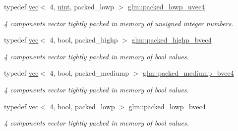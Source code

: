 \begin{DoxyCompactItemize}
\mbox{\label{group__gtc__type__aligned_gaddae01027a0dc8e3d953a3ca68b5a0cd}} 
typedef \hyperlink{structglm_1_1vec}{vec}$<$ 4, \hyperlink{group__core__precision_ga4fd29415871152bfb5abd588334147c8}{uint}, packed\+\_\+lowp $>$ \hyperlink{group__gtc__type__aligned_gaddae01027a0dc8e3d953a3ca68b5a0cd}{glm\+::packed\+\_\+lowp\+\_\+uvec4}
\begin{DoxyCompactList}\small\item\em 4 components vector tightly packed in memory of unsigned integer numbers. \end{DoxyCompactList}\item 
\mbox{\label{group__gtc__type__aligned_gaa7a006e26052e668a16bf3b8bd81cbef}} 
typedef \hyperlink{structglm_1_1vec}{vec}$<$ 4, bool, packed\+\_\+highp $>$ \hyperlink{group__gtc__type__aligned_gaa7a006e26052e668a16bf3b8bd81cbef}{glm\+::packed\+\_\+highp\+\_\+bvec4}
\begin{DoxyCompactList}\small\item\em 4 components vector tightly packed in memory of bool values. \end{DoxyCompactList}\item 
\mbox{\label{group__gtc__type__aligned_gad50db2a2ae76ec64785b9d87cd2dfb2c}} 
typedef \hyperlink{structglm_1_1vec}{vec}$<$ 4, bool, packed\+\_\+mediump $>$ \hyperlink{group__gtc__type__aligned_gad50db2a2ae76ec64785b9d87cd2dfb2c}{glm\+::packed\+\_\+mediump\+\_\+bvec4}
\begin{DoxyCompactList}\small\item\em 4 components vector tightly packed in memory of bool values. \end{DoxyCompactList}\item 
\mbox{\label{group__gtc__type__aligned_ga7340a9bf8a974a263c6eaef48133331c}} 
typedef \hyperlink{structglm_1_1vec}{vec}$<$ 4, bool, packed\+\_\+lowp $>$ \hyperlink{group__gtc__type__aligned_ga7340a9bf8a974a263c6eaef48133331c}{glm\+::packed\+\_\+lowp\+\_\+bvec4}
\begin{DoxyCompactList}\small\item\em 4 components vector tightly packed in memory of bool values. \end{DoxyCompactList}\item 
\mbox{\label{group__gtc__type__aligned_ga8cf75c112dfa39264b7ef65c2ed6b3c4}} 

\end{DoxyCompactItemize}
